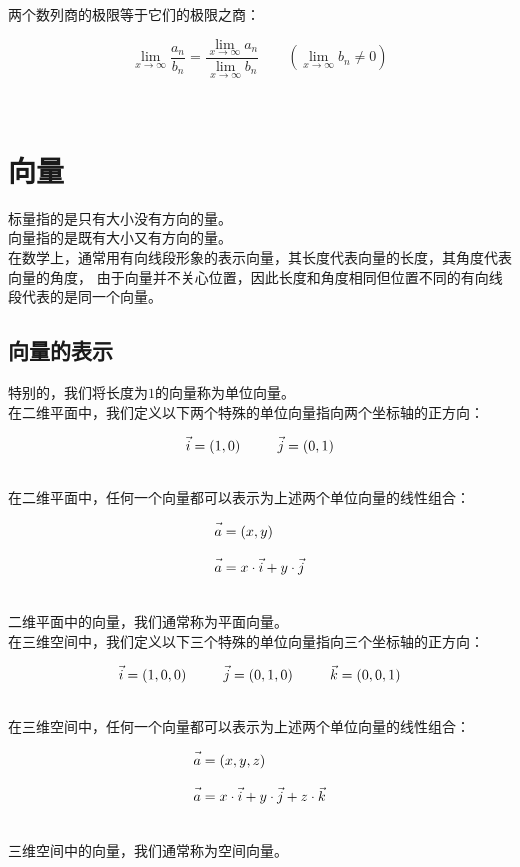 \documentclass[UTF8]{ctexart}
\let\nvec\vec
\def\vec#1{\nvec{\vphantom b\smash{#1}}}
\begin{document}
    两个数列商的极限等于它们的极限之商：
    \begin{large}
        \begin{equation*}
            \lim_{x\to\infty}\frac{a_{n}}{b_{n}}=\frac{\lim\limits_{x\to\infty}a_{n}}{\lim\limits_{x\to\infty}b_{n}}\qquad\left(\lim_{x\to\infty}b_n\neq 0\right)
        \end{equation*}
    \end{large}\\


\newpage

\section{向量}
    标量指的是只有大小没有方向的量。\\[3mm]
    向量指的是既有大小又有方向的量。\\[3mm]
    在数学上，通常用有向线段形象的表示向量，其长度代表向量的长度，其角度代表向量的角度，
    由于向量并不关心位置，因此长度和角度相同但位置不同的有向线段代表的是同一个向量。

\subsection{向量的表示}
    特别的，我们将长度为$1$的向量称为单位向量。\\[6mm]
    在二维平面中，我们定义以下两个特殊的单位向量指向两个坐标轴的正方向：
    \begin{large}
        \begin{equation*}
            \vec{i}=(1,0)~~~~~~~~\vec{j}=(0,1)
        \end{equation*}
    \end{large}\\
    在二维平面中，任何一个向量都可以表示为上述两个单位向量的线性组合：
    \begin{large}
        \begin{align*}
            &\vec{a}=(x,y)\\[3mm]
            &\vec{a}=x\cdot\vec{i}+y\cdot\vec{j}
        \end{align*}
    \end{large}\\
    二维平面中的向量，我们通常称为平面向量。\\[12mm]
    在三维空间中，我们定义以下三个特殊的单位向量指向三个坐标轴的正方向：
    \begin{large}
        \begin{equation*}
            \vec{i}=(1,0,0)~~~~~~~~\vec{j}=(0,1,0)~~~~~~~~\vec{k}=(0,0,1)
        \end{equation*}
    \end{large}\\
    在三维空间中，任何一个向量都可以表示为上述两个单位向量的线性组合：
    \begin{large}
        \begin{align*}
            &\vec{a}=(x,y,z)\\[3mm]
            &\vec{a}=x\cdot\vec{i}+y\cdot\vec{j}+z\cdot\vec{k}
        \end{align*}
    \end{large}\\
    三维空间中的向量，我们通常称为空间向量。
\end{document}
